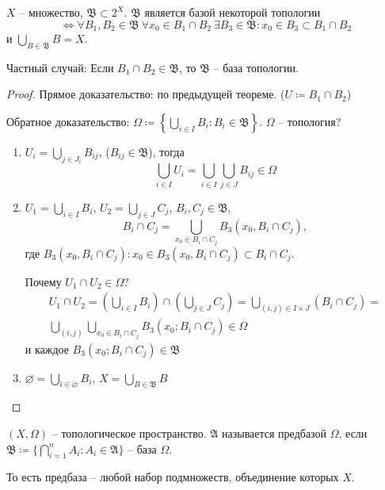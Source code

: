 \documentclass[main]{subfiles}
\begin{document}
\begin{theorem}
    $X$ -- множество, $\mathfrak{B} \subset 2^X$. $\mathfrak{B}$ является базой некоторой топологии
    \[\Leftrightarrow \forall B_1, B_2 \in \mathfrak{B}\ \forall x_0 \in B_1 \cap B_2\ \exists B_3 \in \mathfrak{B}: x_0 \in B_3 \subset B_1 \cap B_2\]
    и $\bigcup_{B \in \mathfrak{B}} B = X$.
\end{theorem}
\begin{remark}
    Частный случай: Если $B_1 \cap B_2 \in \mathfrak{B}$, то $\mathfrak{B}$ -- база топологии.
\end{remark}
\begin{proof}
    Прямое доказательство: по предыдущей теореме. ($U \coloneqq B_1 \cap B_2$)

    Обратное доказательство: $\Omega \coloneqq \left\{\bigcup_{i \in I} B_i: B_i \in \mathfrak{B}\right\}$.
    $\Omega$ -- топология?
    \begin{enumerate}
        \item $U_i = \bigcup_{j \in J_i} B_{ij}$, ($B_{ij} \in \mathfrak{B}$), тогда
              \[\bigcup_{i \in I} U_i = \bigcup_{i \in I} \bigcup_{j \in J} B_{ij} \in \Omega\]
        \item $U_1 = \bigcup_{i \in I} B_i$, $U_2 = \bigcup_{j \in J} C_j$, $B_i, C_j \in \mathfrak{B}$,
              \[B_i \cap C_j = \bigcup_{x_0 \in B_i \cap C_j} B_3 (x_0, B_i \cap C_j),\]
              где $B_3(x_0, B_i \cap C_j): x_0 \in B_3(x_0, B_i \cap C_j) \subset B_i \cap C_j$.

              Почему $U_1 \cap U_2 \in \Omega$?
              \begin{multline*}
                  U_1 \cap U_2 = \left(\bigcup_{i \in I} B_i\right) \cap \left(\bigcup_{j \in J} C_j\right) = \bigcup_{(i,j) \in I \times J} (B_i \cap C_j) = \\
                  \bigcup_{(i,j)} \bigcup_{x_0 \in B_i \cap C_j} B_3 (x_0; B_i \cap C_j) \in \Omega
              \end{multline*}
              и каждое $B_3 (x_0; B_i \cap C_j) \in \mathfrak{B}$
        \item $\varnothing = \bigcup_{i \in \varnothing} B_i$, $X = \bigcup_{B \in \mathfrak{B}} B$
    \end{enumerate}
\end{proof}

\begin{definition}
    $(X, \Omega)$ -- топологическое пространство. $\mathfrak{A}$ называется предбазой $\Omega$, если
    $\mathfrak{B} \coloneqq \{\bigcap_{i = 1}^n A_i : A_i \in \mathfrak{A}\}$ -- база $\Omega$.

    То есть предбаза -- любой набор подмножеств, объединение которых $X$.
\end{definition}
\end{document}
